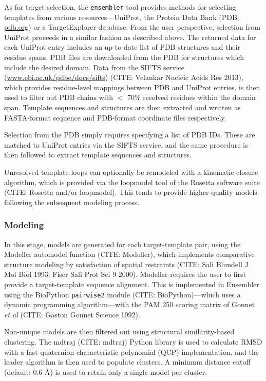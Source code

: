 \documentclass[aps,pre,twocolumn,nofootinbib,superscriptaddress,linenumbers]{revtex4-1}
\begin{document}
As for target selection, the {\tt ensembler} tool provides methods for
selecting templates from various resources---UniProt, the Protein Data Bank
(PDB; \href{http://www.pdb.org}{pdb.org}) or a TargetExplorer database.  From
the user perspective, selection from UniProt proceeds in a similar fashion as
described above. The returned data for each UniProt entry includes an
up-to-date list of PDB structures and their residue spans. PDB files are
downloaded from the PDB for structures which include the desired domain. Data
from the SIFTS service
(\href{http://www.ebi.ac.uk/pdbe/docs/sifts/}{www.ebi.ac.uk/pdbe/docs/sifts})
(CITE: Velankar Nucleic Acids Res 2013), which provides residue-level mappings
between PDB and UniProt entries, is then used to filter out PDB chains with $<$
70\% resolved residues within the domain span. Template sequences and
structures are then extracted and written as FASTA-format sequence and
PDB-format coordinate files respectively.

Selection from the PDB simply requires specifying a list of PDB IDs. These are
matched to UniProt entries via the SIFTS service, and the same procedure is
then followed to extract template sequences and structures.

Unresolved template loops can optionally be remodeled with a kinematic closure
algorithm, which is provided via the loopmodel tool of the Rosetta software
suite (CITE: Rosetta and/or loopmodel). This tends to provide higher-quality
models following the subsequent modeling process.

\subsubsection{Modeling}

In this stage, models are generated for each target-template pair, using the
Modeller automodel function (CITE: Modeller), which implements comparative
structure modeling by satisfaction of spatial restraints (CITE: Sali Blundell J
Mol Biol 1993; Fiser Sali Prot Sci 9 2000). Modeller requires the user to first
provide a target-template sequence alignment. This is implemented in Ensembler
using the BioPython {\tt pairwise2} module (CITE: BioPython)---which uses a
dynamic programming algorithm---with the PAM 250 scoring matrix of Gonnet
\textit{et al} (CITE: Gaston Gonnet Science 1992).

Non-unique models are then filtered out using structural similarity-based
clustering. The mdtraj (CITE: mdtraj) Python library is used to calculate RMSD
with a fast quaternion characteristic polynomial (QCP) implementation, and the
leader algorithm is then used to populate clusters. A minimum distance cutoff
(default: 0.6 \AA) is used to retain only a single model per cluster.
\end{document}
